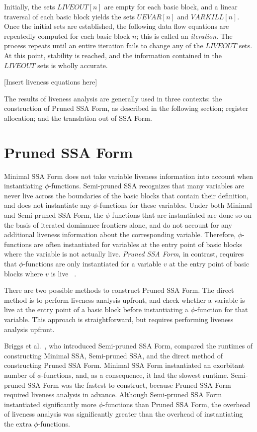 Initially, the sets $LIVEOUT[n]$ are empty for each basic 
block, and a linear traversal of each basic block yields
the sets $UEVAR[n]$ and $VARKILL[n]$. Once the initial sets
are established, the following data flow equations are
repeatedly computed for each basic block $n$; this is 
called an \emph{iteration}. The process repeats until an 
entire iteration fails to change any of the $LIVEOUT$ sets.
At this point, stability is reached, and the information
contained in the $LIVEOUT$ sets is wholly accurate.

[Insert liveness equations here]

The results of liveness analysis are generally used in
three contexts: the construction of Pruned SSA Form,
as described in the following section; register allocation;
and the translation out of SSA Form. 

\section{Pruned SSA Form}

Minimal SSA Form does not take variable liveness information
into account when instantiating $\phi$-functions. Semi-pruned
SSA recognizes that many variables are never live across
the boundaries of the basic blocks that contain their 
definition, and does not instantiate any $\phi$-functions
for these variables. Under both Minimal and Semi-pruned
SSA Form, the $\phi$-functions that are instantiated are
done so on the basis of iterated dominance frontiers alone,
and do not account for any additional liveness information
about the corresponding variable. Therefore, $\phi$-functions
are often instantiated for variables at the entry point of
basic blocks where the variable is not actually live. 
\emph{Pruned SSA Form}, in contrast, requires that 
$\phi$-functions are only instantiated for a variable $v$
at the entry point of basic blocks where $v$ is live
~\cite{ChoiJan91}.  

There are two possible methods to construct Pruned SSA Form.
The direct method is to perform liveness analysis upfront, and
check whether a variable is live at the entry point of a 
basic block before instantiating a $\phi$-function for that
variable. This approach is straightforward, but requires
performing liveness analysis upfront. 

Briggs et al.~\cite{BriggsJul98}, who introduced Semi-pruned
SSA Form, compared the runtimes of constructing Minimal SSA,
Semi-pruned SSA, and the direct method of constructing Pruned
SSA Form. Minimal SSA Form instantiated an exorbitant number
of $\phi$-functions, and, as a consequence, it had the slowest
runtime. Semi-pruned SSA Form was the fastest to construct,
because Pruned SSA Form required liveness analysis in advance.
Although Semi-pruned SSA Form instantiated significantly 
more $\phi$-functions than Pruned SSA Form, the overhead of
liveness analysis was significantly greater than the overhead
of instantiating the extra $\phi$-functions. 

